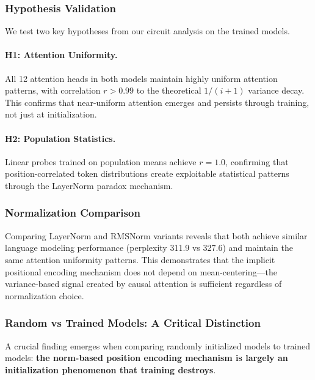 \documentclass[11pt]{article}
\begin{document}
\subsubsection{Hypothesis Validation}

We test two key hypotheses from our circuit analysis on the trained models.

\paragraph{H1: Attention Uniformity.} All 12 attention heads in both models maintain highly uniform attention patterns, with correlation $r > 0.99$ to the theoretical $1/(i+1)$ variance decay. This confirms that near-uniform attention emerges and persists through training, not just at initialization.

\paragraph{H2: Population Statistics.} Linear probes trained on population means achieve $r = 1.0$, confirming that position-correlated token distributions create exploitable statistical patterns through the LayerNorm paradox mechanism.

\subsubsection{Normalization Comparison}

Comparing LayerNorm and RMSNorm variants reveals that both achieve similar language modeling performance (perplexity 311.9 vs 327.6) and maintain the same attention uniformity patterns. This demonstrates that the implicit positional encoding mechanism does not depend on mean-centering---the variance-based signal created by causal attention is sufficient regardless of normalization choice.

\subsubsection{Random vs Trained Models: A Critical Distinction}\label{sec:random-vs-trained}

A crucial finding emerges when comparing randomly initialized models to trained models: \textbf{the norm-based position encoding mechanism is largely an initialization phenomenon that training destroys}.
\end{document}
